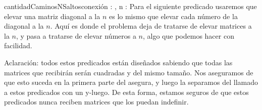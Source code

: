\documentclass[10pt,a4paper]{article}
\begin{document}
\begin{proc}{cantidadCaminosNSaltos}{\Inout conexi\'on : \TLista{\TLista{\ent}}, \In n : \ent}{}
	\vspace{0.3cm}
	Para el siguiente predicado usaremos que elevar una matriz diagonal a la $n$ es lo mismo que elevar cada n\'umero 
	de la diagonal a la $n$. Aqu\'i es donde el problema deja de tratarse de elevar matrices a la $n$, y pasa a 
	tratarse de elevar n\'umeros a $n$, algo que podemos hacer con facilidad.
	
	{}
	
	{}
	
	{}
	
	\vspace{0.3cm}
	Aclaraci\'on: todos estos predicados est\'an diseñados sabiendo que todas las matrices que recibirán serán cuadradas y del mismo tamaño.
	Nos aseguramos de que esto suceda en la primera parte del asegura, y luego la separamos del llamado a estos predicados con un y-luego. De esta forma, estamos seguros de que 
	estos predicados nunca reciben matrices que los puedan indefinir.
\end{proc}

\pagebreak
\end{document}
